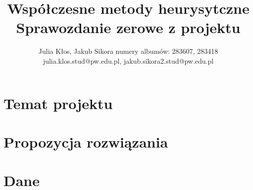 \documentclass{article}
\title{Współczesne metody heurysytczne\\ Sprawozdanie zerowe z projektu}
\author{
Julia Kłos, Jakub Sikora
\affiliations
numery albumów: 283607, 283418 \\
\emails
julia.klos.stud@pw.edu.pl, jakub.sikora2.stud@pw.edu.pl
}
\begin{document}
\maketitle

\section{Temat projektu}
\label{sec:temat}

\section{Propozycja rozwiązania}
\label{sec:rozwiazanie}

\section{Dane}
\label{sec:dane}
\end{document}
